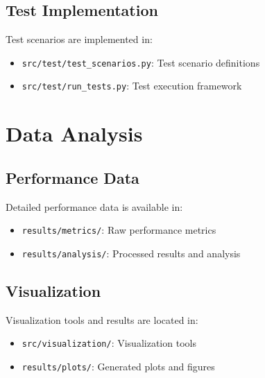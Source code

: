 \documentclass[12pt]{article}
\begin{document}
\subsection{Test Implementation}
Test scenarios are implemented in:
\begin{itemize}[noitemsep]
    \item \texttt{src/test/test\_scenarios.py}: Test scenario definitions
    \item \texttt{src/test/run\_tests.py}: Test execution framework
\end{itemize}

\section{Data Analysis}
\subsection{Performance Data}
Detailed performance data is available in:
\begin{itemize}[noitemsep]
    \item \texttt{results/metrics/}: Raw performance metrics
    \item \texttt{results/analysis/}: Processed results and analysis
\end{itemize}

\subsection{Visualization}
Visualization tools and results are located in:
\begin{itemize}[noitemsep]
    \item \texttt{src/visualization/}: Visualization tools
    \item \texttt{results/plots/}: Generated plots and figures
\end{itemize}
\end{document}
